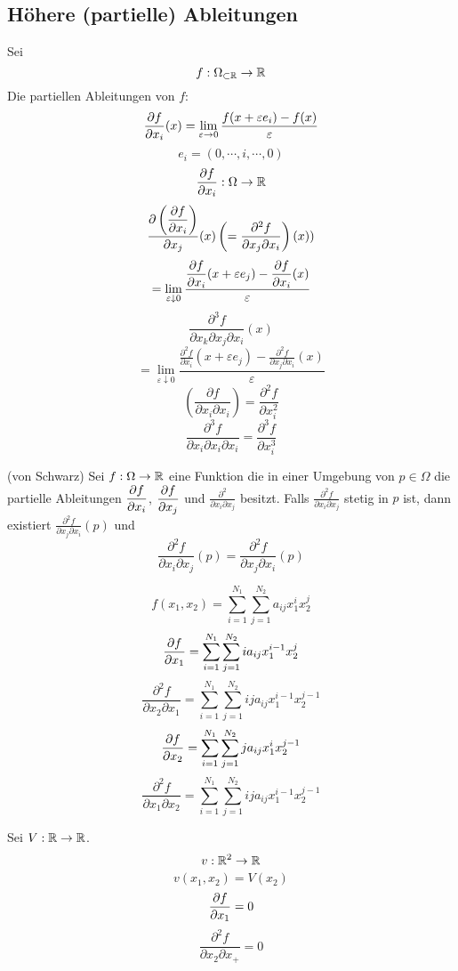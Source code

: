 \subsection{Höhere (partielle) Ableitungen}
Sei
\[f:\Omega_{\subset\mathbb{R}}\rightarrow\mathbb{R}\]
Die partiellen Ableitungen von $f$:
\[\dfrac{\partial f}{\partial x_i}(x)=\displaystyle\lim_{\varepsilon\rightarrow0}\frac{f(x+\varepsilon e_i)-f(x)}{\varepsilon}\]
\[e_i=(0,\cdots,i,\cdots,0)\]
\[\dfrac{\partial f}{\partial x_i}:\Omega\rightarrow\mathbb{R}\]
\[\dfrac{\partial \left( \dfrac{\partial f}{\partial x_i} \right)}{\partial x_j}(x)\left(=\frac{\partial^2f}{\partial x_j\partial x_i} \right)(x))\]
\[=\lim_{\varepsilon\downarrow 0}\frac{\dfrac{\partial f}{\partial x_i}(x+\varepsilon e_j)-\dfrac{\partial f}{\partial x_i}(x)}{\varepsilon}\]
\[\frac{\partial^3f}{\partial x_k\partial x_j \partial x_i}(x)\]
\[=\lim_{\varepsilon\downarrow 0}\frac{\frac{\partial^2f}{\partial x_i}(x+\varepsilon e_j)-\frac{\partial ^2f}{\partial x_j \partial x_i}(x)}{\varepsilon}\]
\[\left( \frac{\partial f}{\partial x_i \partial x_i} \right)=\frac{\partial^2 f}{\partial x_i^2}\]
\[\frac{\partial^3 f}{\partial x_i \partial x_i \partial x_i}=\frac{\partial^3 f}{\partial x_i^3}\]
\begin{Sat}
  (von Schwarz) Sei $f:\Omega\rightarrow\mathbb{R}$ eine Funktion die in einer Umgebung von $p\in\Omega$ die partielle Ableitungen $\dfrac{\partial f}{\partial x_i}$, $\dfrac{\partial f}{\partial x_j}$ und $\frac{\partial^2}{\partial x_i \partial x_j}$ besitzt. Falls $\frac{\partial^2 f}{\partial x_i \partial x_j}$ stetig in $p$ ist, dann existiert $\frac{\partial^2 f}{\partial x_j\partial x_i}(p)$ und
  \[\frac{\partial^2 f}{\partial x_i\partial x_j}(p)=\frac{\partial^2 f}{\partial x_j\partial x_i}(p)\]
\end{Sat}
\begin{Bsp}
  \[f(x_1,x_2)=\sum_{i=1}^{N_1}\sum_{j=1}^{N_2}a_{ij}x_1^ix_2^j\]
  \[\dfrac{\partial f}{\partial x_1}=\sum_{i=1}^{N_1}\sum_{j=1}^{N_2}ia_{ij}x_1^{i-1}x_2^j\]
  \[\frac{\partial^2 f}{\partial x_2\partial x_1}=\sum_{i=1}^{N_1}\sum_{j=1}^{N_2}ija_{ij}x_1^{i-1}x_2^{j-1}\]
  \[\dfrac{\partial f}{\partial x_2}=\sum_{i=1}^{N_1}\sum_{j=1}^{N_2}ja_{ij}x_1^ix_2^{j-1}\]
  \[\frac{\partial^2 f}{\partial x_1\partial x_2}=\sum_{i=1}^{N_1}\sum_{j=1}^{N_2}ija_{ij}x_1^{i-1}x_2^{j-1}\]
\end{Bsp}
\begin{Bsp}
  Sei $V:\mathbb{R}\rightarrow\mathbb{R}$.
  \[v:\mathbb{R}^2\rightarrow\mathbb{R}\]
  \[v(x_1,x_2)=V(x_2)\]
  \[\dfrac{\partial f}{\partial x_1}=0\]
  \[\frac{\partial^2f}{\partial x_2\partial x_+}=0\]
\end{Bsp}
